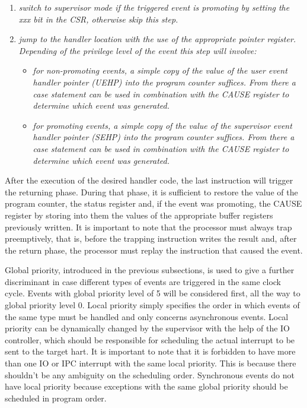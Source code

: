 \begin{enumerate}
            \item \textit{switch to supervisor mode if the triggered event is promoting by setting the xxx bit in the CSR, otherwise skip this step.}

            \item \textit{jump to the handler location with the use of the appropriate pointer register. Depending of the privilege level of the event this step will involve:}

                \begin{itemize}

                    \item \textit{for non-promoting events, a simple copy of the value of the user event handler pointer (UEHP) into the program counter suffices. From there a case statement can be used in combination with the CAUSE register to determine which event was generated.}

                    \item \textit{for promoting events, a simple copy of the value of the supervisor event handler pointer (SEHP) into the program counter suffices. From there a case statement can be used in combination with the CAUSE register to determine which event was generated.}

                \end{itemize}

        \end{enumerate}

        After the execution of the desired handler code, the last instruction will trigger the returning phase. During that phase, it is sufficient to restore the value of the program counter, the status register and, if the event was promoting, the CAUSE register by storing into them the values of the appropriate buffer registers previously written. It is important to note that the processor must always trap preemptively, that is, before the trapping instruction writes the result and, after the return phase, the processor must replay the instruction that caused the event.

        \vspace{10pt}

        Global priority, introduced in the previous subsections, is used to give a further discriminant in case different types of events are triggered in the same clock cycle. Events with global priority level of 5 will be considered first, all the way to global priority level 0. Local priority simply specifies the order in which events of the same type must be handled and only concerns asynchronous events. Local priority can be dynamically changed by the supervisor with the help of the IO controller, which should be responsible for scheduling the actual interrupt to be sent to the target hart. It is important to note that it is forbidden to have more than one IO or IPC interrupt with the same local priority. This is because there shouldn't be any ambiguity on the scheduling order. Synchronous events do not have local priority because exceptions with the same global priority should be scheduled in program order.

